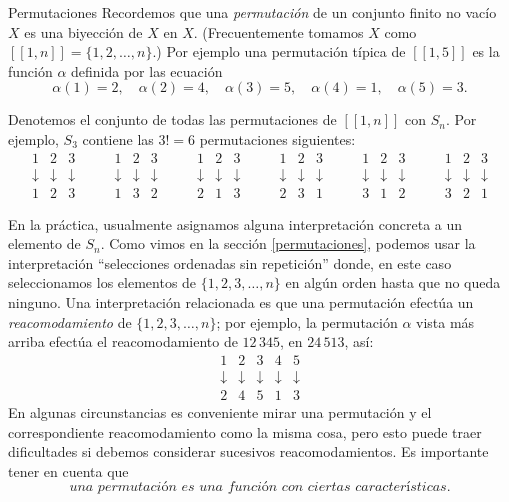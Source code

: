 \begin{section}{Permutaciones}
Recordemos  que una \textit{permutación} de un conjunto finito no vacío $X$ es una biyección de $X$ en $X$. (Frecuentemente tomamos $X$ como $ [[1,n]]=\{1,2,\ldots,n\}$.) Por ejemplo una permutación típica de $[[1,5]]$ es la función $\alpha$ definida por las ecuación
$$
\alpha(1)=2,\quad \alpha(2)=4,\quad \alpha(3)=5,\quad
\alpha(4)=1,\quad \alpha(5)=3.
$$

Denotemos el conjunto de todas las permutaciones de $[[1,n]]$ con $S_n$. Por ejemplo, $S_3$ contiene las $3!=6$ permutaciones siguientes:
$$
\begin{matrix} 1&2&3 \\ \downarrow&\downarrow&\downarrow\\1 &2 &
3\end{matrix}\qquad
\begin{matrix} 1&2&3 \\ \downarrow&\downarrow&\downarrow\\1 &3 &2 \end{matrix}\qquad
\begin{matrix} 1&2&3 \\ \downarrow&\downarrow&\downarrow\\2 & 1&3 \end{matrix}
\qquad
\begin{matrix} 1&2&3 \\ \downarrow&\downarrow&\downarrow\\2 & 3&1
\end{matrix}\qquad
\begin{matrix} 1&2&3 \\
\downarrow&\downarrow&\downarrow\\3 &1 &2 \end{matrix}\qquad
\begin{matrix} 1&2&3 \\ \downarrow&\downarrow&\downarrow\\3 &2 &1
\end{matrix}
$$


En la práctica, usualmente asignamos alguna interpretación concreta a un elemento de $S_n$. Como vimos en la sección \ref{permutaciones}, podemos usar la interpretación ``selecciones ordenadas sin repetición''   donde, en este caso seleccionamos los elementos de $\{1,2,3,\ldots,n\}$ en algún orden hasta que no queda ninguno. Una interpretación relacionada es que una permutación efectúa un \textit{reacomodamiento} de $\{1,2,3,\ldots,n\}$; por ejemplo, la permutación $\alpha$ vista más arriba  efectúa el reacomodamiento de $12\,345$, en $24\,513$, así:
$$
\begin{matrix} 1&2&3&4&5 \\
\downarrow&\downarrow&\downarrow&\downarrow&\downarrow\\2 &4 &5 &1
& 3
\end{matrix}
$$
En algunas circunstancias es conveniente mirar una permutación y el correspondiente reacomodamiento como la misma cosa, pero esto puede traer dificultades si debemos considerar sucesivos reacomodamientos. Es importante tener en cuenta que 
$$
\textit{una permutación es una función con ciertas características.}
$$


\end{section}
